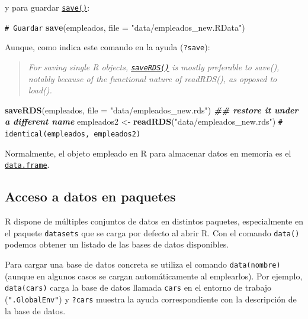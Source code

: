 \documentclass[
]{book}
\newenvironment{Shaded}{\begin{snugshade}}{\end{snugshade}}
\newcommand{\AttributeTok}[1]{\textcolor[rgb]{0.13,0.29,0.53}{#1}}
\newcommand{\CommentTok}[1]{\textcolor[rgb]{0.56,0.35,0.01}{\textit{#1}}}
\newcommand{\DocumentationTok}[1]{\textcolor[rgb]{0.56,0.35,0.01}{\textbf{\textit{#1}}}}
\newcommand{\FunctionTok}[1]{\textcolor[rgb]{0.13,0.29,0.53}{\textbf{#1}}}
\newcommand{\NormalTok}[1]{#1}
\newcommand{\OtherTok}[1]{\textcolor[rgb]{0.56,0.35,0.01}{#1}}
\newcommand{\StringTok}[1]{\textcolor[rgb]{0.31,0.60,0.02}{#1}}
\theoremstyle{break}
\theoremstyle{nonumberplain}
\renewcommand{\CommentTok}[1]{\textcolor[rgb]{0.41,0.41,0.41}{\texttt{#1}}}
\begin{document}
y para guardar \href{https://www.rdocumentation.org/packages/base/versions/3.6.1/topics/save}{\texttt{save()}}:

\begin{Shaded}
\begin{Highlighting}[]
\CommentTok{\# Guardar}
\FunctionTok{save}\NormalTok{(empleados, }\AttributeTok{file =} \StringTok{"data/empleados\_new.RData"}\NormalTok{)}
\end{Highlighting}
\end{Shaded}

Aunque, como indica este comando en la ayuda (\texttt{?save}):

\begin{quote}
\emph{For saving single R objects, \href{https://www.rdocumentation.org/packages/base/versions/3.6.1/topics/saveRDS}{\texttt{saveRDS()}}}
\emph{is mostly preferable to save(),}
\emph{notably because of the functional nature of readRDS(), as opposed to load().}
\end{quote}

\begin{Shaded}
\begin{Highlighting}[]
\FunctionTok{saveRDS}\NormalTok{(empleados, }\AttributeTok{file =} \StringTok{"data/empleados\_new.rds"}\NormalTok{)}
\DocumentationTok{\#\# restore it under a different name}
\NormalTok{empleados2 }\OtherTok{\textless{}{-}} \FunctionTok{readRDS}\NormalTok{(}\StringTok{"data/empleados\_new.rds"}\NormalTok{)}
\CommentTok{\# identical(empleados, empleados2)}
\end{Highlighting}
\end{Shaded}

Normalmente, el objeto empleado en R para almacenar datos en memoria
es el \href{https://www.rdocumentation.org/packages/base/versions/3.6.1/topics/data.frame}{\texttt{data.frame}}.

\subsection{Acceso a datos en paquetes}\label{acceso-a-datos-en-paquetes}

R dispone de múltiples conjuntos de datos en distintos paquetes, especialmente en el paquete \texttt{datasets}
que se carga por defecto al abrir R.
Con el comando \texttt{data()} podemos obtener un listado de las bases de datos disponibles.

Para cargar una base de datos concreta se utiliza el comando
\texttt{data(nombre)} (aunque en algunos casos se cargan automáticamente al emplearlos).
Por ejemplo, \texttt{data(cars)} carga la base de datos llamada \texttt{cars} en el entorno de trabajo (\texttt{".GlobalEnv"})
y \texttt{?cars} muestra la ayuda correspondiente con la descripción de la base de datos.
\end{document}
